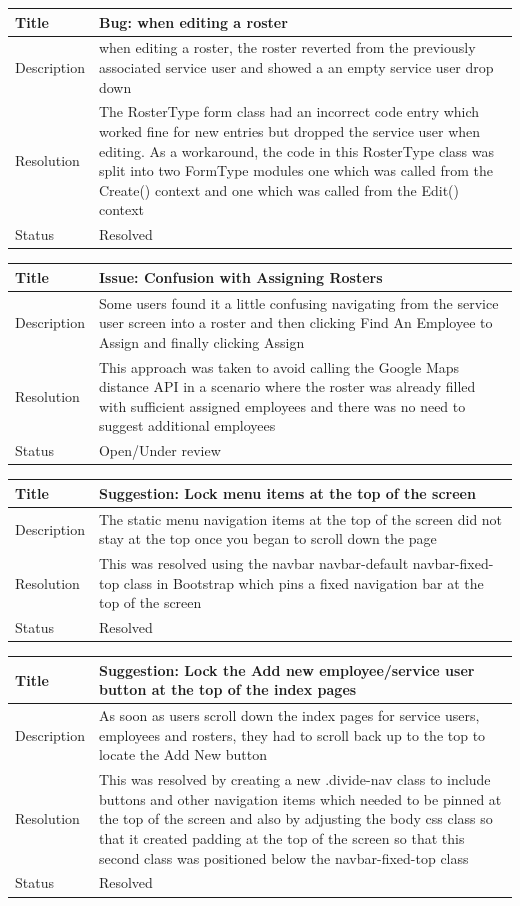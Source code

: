 \documentclass[a4paper,12pt]{article}
\newcommand\addrow[2]{#1 &#2\\ }
\newcommand\addheading[2]{#1 &#2\\ \hline}
\newcommand\tabularhead{\begin{tabular}{lp{11cm}}
\hline
}
\newenvironment{usecase}{\tabularhead}
{\hline\end{tabular}}
\begin{document}
\begin{usecase}
    \addheading{Title}{Bug: when editing a roster}
  \addheading{Description}{when editing a roster, the roster reverted from the previously associated service user and showed a an empty service user drop down }
  \addrow{Resolution}{The RosterType form class had an incorrect code entry which worked fine for new entries but dropped the service user when editing. As a workaround, the code in this RosterType class was split into two FormType modules one which was called from the Create() context and one which was called from the Edit() context}
  \addrow{Status}{Resolved}
\end{usecase}


\begin{usecase}
    \addheading{Title}{Issue: Confusion with Assigning Rosters}
  \addheading{Description}{Some users found it a little confusing navigating from the service user screen into a roster and then clicking Find An Employee to Assign and finally clicking Assign}
  \addrow{Resolution}{This approach was taken to avoid calling the Google Maps distance API in a scenario where the roster was already filled with sufficient assigned employees and there was no need to suggest additional employees}
  \addrow{Status}{Open/Under review}
\end{usecase} 


\begin{usecase}
    \addheading{Title}{Suggestion: Lock menu items at the top of the screen}
  \addheading{Description}{The static menu navigation items at the top of the screen did not stay at the top once you began to scroll down the page}
  \addrow{Resolution}{This was resolved using the navbar navbar-default navbar-fixed-top class in Bootstrap which pins a fixed navigation bar at the top of the screen}
  \addrow{Status}{Resolved}
\end{usecase} 


\begin{usecase}
    \addheading{Title}{Suggestion: Lock the Add new employee/service user button at the top of the index pages}
  \addheading{Description}{As soon as users scroll down the index pages for service users, employees and rosters, they had to scroll back up to the top to locate the Add New button}
  \addrow{Resolution}{This was resolved by creating a new .divide-nav class to include buttons and other navigation items which needed to be pinned at the top of the screen and also by adjusting the body css class so that it created padding at the top of the screen so that this second class was positioned below the navbar-fixed-top class}
  \addrow{Status}{Resolved}
\end{usecase} 
\newpage
\end{document}
